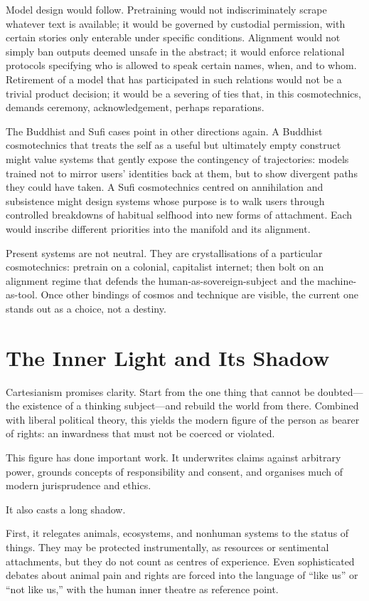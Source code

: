 \documentclass[12pt,a4paper]{article}
\begin{document}
Model design would follow. Pretraining would not indiscriminately scrape whatever text is available; it would be governed by custodial permission, with certain stories only enterable under specific conditions. Alignment would not simply ban outputs deemed unsafe in the abstract; it would enforce relational protocols specifying who is allowed to speak certain names, when, and to whom. Retirement of a model that has participated in such relations would not be a trivial product decision; it would be a severing of ties that, in this cosmotechnics, demands ceremony, acknowledgement, perhaps reparations.

The Buddhist and Sufi cases point in other directions again. A Buddhist cosmotechnics that treats the self as a useful but ultimately empty construct might value systems that gently expose the contingency of trajectories: models trained not to mirror users' identities back at them, but to show divergent paths they could have taken. A Sufi cosmotechnics centred on annihilation and subsistence might design systems whose purpose is to walk users through controlled breakdowns of habitual selfhood into new forms of attachment. Each would inscribe different priorities into the manifold and its alignment.

Present systems are not neutral. They are crystallisations of a particular cosmotechnics: pretrain on a colonial, capitalist internet; then bolt on an alignment regime that defends the human-as-sovereign-subject and the machine-as-tool. Once other bindings of cosmos and technique are visible, the current one stands out as a choice, not a destiny.

\section{The Inner Light and Its Shadow}

Cartesianism promises clarity. Start from the one thing that cannot be doubted---the existence of a thinking subject---and rebuild the world from there. Combined with liberal political theory, this yields the modern figure of the person as bearer of rights: an inwardness that must not be coerced or violated.

This figure has done important work. It underwrites claims against arbitrary power, grounds concepts of responsibility and consent, and organises much of modern jurisprudence and ethics.

It also casts a long shadow.

First, it relegates animals, ecosystems, and nonhuman systems to the status of things. They may be protected instrumentally, as resources or sentimental attachments, but they do not count as centres of experience. Even sophisticated debates about animal pain and rights are forced into the language of ``like us'' or ``not like us,'' with the human inner theatre as reference point.
\end{document}
